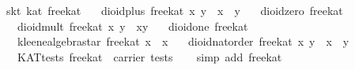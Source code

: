 \begin{isabellebody}
{\isafoldproof}%
%
\isadelimproof
\isanewline
%
\endisadelimproof
\isanewline
{}\isamarkupfalse%
\ skt{}\ kat\ free{}kat\isanewline
\ \ \ {}dioid{}plus\ free{}kat\ x\ y\ {}\ x\ {}\ y{}\isanewline
\ \ \ {}dioid{}zero\ free{}kat\ {}\ {}{}\isanewline
\ \ \ {}dioid{}mult\ free{}kat\ x\ y\ {}\ x{}y{}\isanewline
\ \ \ {}dioid{}one\ free{}kat\ {}\ {}{}\isanewline
\ \ \ {}kleene{}algebra{}star\ free{}kat\ x\ {}\ x\isanewline
\ \ \ {}dioid{}nat{}order\ free{}kat\ x\ y\ {}\ {}x\ {}\ y{}{}\isanewline
\ \ \ {}KAT{}tests\ free{}kat\ {}\ carrier\ tests{}\isanewline
%
\isadelimproof
\ \ %
\endisadelimproof
%
\isatagproof
{}\isamarkupfalse%
\ {}simp\ add{}\ free{}kat{}\isanewline

\end{isabellebody}
